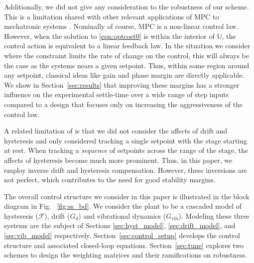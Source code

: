 \documentclass[twocolumn,twoside]{IEEEtran}
\newcommand{\Gv}{\ensuremath{G_{\text{vib}}}\xspace}
\begin{document}
Additionally, we did not give any consideration to the robustness of our scheme. This is a limitation shared with other relevant applications of MPC to mechatronic systems \cite{Wills_CDC_2005, Lin_ASME_2012, rana_design_2014}. Nominally of course, MPC is a non-linear control law. However, when the solution to \eqref{eqn:optcost0} is within the interior of $\mathds{U}$, the control action is equivalent to a linear feedback law. In the situation we consider where the constraint limits the rate of change on the control, this will always be the case as the systems nears a given setpoint. Thus, within some region around any setpoint, classical ideas like gain and phase margin are directly applicable. We show in Section~\ref{sec:results} that improving these margins has a stronger influence on the experimental settle-time over a wide range of step inputs compared to a design that focuses only on increasing the aggressiveness of the control law.

A related limitation of \cite{braker_application_2017} is that we did not consider the affects of drift and hysteresis and only considered tracking a single setpoint with the stage starting at rest. When tracking a \emph{sequence} of setpoints across the range of the stage, the affects of hysteresis become much more prominent. Thus, in this paper, we employ inverse drift and hysteresis compensation. However, these inversions are not perfect, which contributes to the need for good stability margins.

The overall control structure we consider in this paper is illustrated in the block diagram in Fig. ~\ref{fig:ss_bd}. We consider the plant to be a cascaded model of hysteresis ($\mathcal{F}$),  drift ($G_d$) and vibrational dynamics ($\Gv$). Modeling these three systems are the subject of Sections \ref{sec:hyst_model}, \ref{sec:drift_model}, and \ref{sec:vib_model} respectively. Section~\ref{sec:control_setup} develops the control structure and associated closed-loop equations. Section~\ref{sec:tune} explores two schemes to design the weighting matrices and their ramifications on robustness. 

\end{document}
